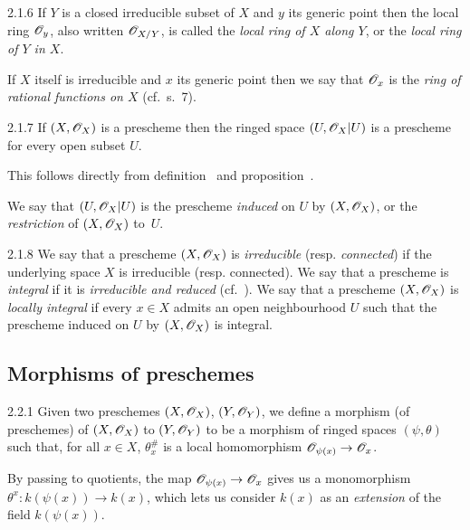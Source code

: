 \documentclass{book}
\begin{document}
\begin{env}{2.1.6}
\label{env-1.2.1.6}
If $Y$ is a closed irreducible subset of $X$ and $y$ its
generic point then the local ring $\mathscr{O}_y$, also written $\mathscr{O}_{X/Y}$, is called the
\emph{local ring of $X$ along $Y$}, or the \emph{local ring of $Y$ in $X$}.

If $X$ itself is irreducible and $x$ its generic point then we say that
$\mathscr{O}_x$ is the \emph{ring of rational functions on $X$} (cf.~s.~7).
\end{env}

\begin{envs}[Proposition]{2.1.7}
\label{prop-1.2.1.7}
If $(X,\mathscr{O}_X)$ is a prescheme then the ringed
space $(U,\mathscr{O}_X|U)$ is a prescheme for every open subset $U$.
\end{envs}

This follows directly from definition~ and
proposition~.

We say that $(U,\mathscr{O}_X|U)$ is the prescheme \emph{induced} on $U$ by
$(X,\mathscr{O}_X)$, or the \emph{restriction} of $(X,\mathscr{O}_X)$ to~$U$.

\begin{env}{2.1.8}
\label{env-1.2.1.8}
We say that a prescheme $(X,\mathscr{O}_X)$ is \emph{irreducible}
(resp. \emph{connected}) if the underlying space $X$ is irreducible (resp.
connected).  We say that a prescheme is \emph{integral} if it is
\emph{irreducible and reduced} (cf.~).  We say that a prescheme
$(X,\mathscr{O}_X)$ is \emph{locally integral} if every $x\in X$ admits an open
neighbourhood $U$ such that the prescheme induced on $U$ by $(X,\mathscr{O}_X)$ is
integral.
\end{env}

\subsection{Morphisms of preschemes}
\label{1-schemes-2.2}

\begin{env}[Definition]{2.2.1}
\label{defn-1.2.2.1}
Given two preschemes $(X,\mathscr{O}_X)$, $(Y,\mathscr{O}_Y)$, we
define a morphism (of preschemes) of $(X,\mathscr{O}_X)$ to $(Y,\mathscr{O}_Y)$ to be a morphism
of ringed spaces $(\psi,\theta)$ such that, for all $x\in X$, $\theta_x^\#$ is a
local homomorphism $\mathscr{O}_{\psi(x)}\to\mathscr{O}_x$.
\end{env}

By passing to quotients, the map $\mathscr{O}_{\psi(x)}\to\mathscr{O}_x$ gives us a
monomorphism $\theta^x\colon k(\psi(x))\to k(x)$, which lets us consider $k(x)$
as an \emph{extension} of the field $k(\psi(x))$.
\end{document}
